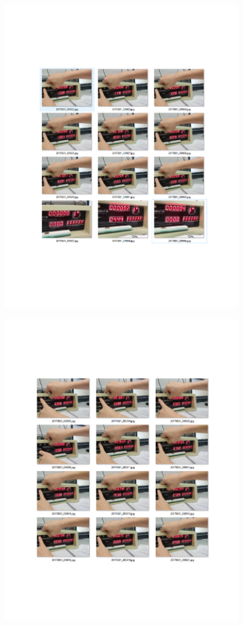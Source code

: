 \documentclass{article}
\begin{document}
					\begin{figure}[!htb]
					\begin{center}
					\includegraphics[width=0.9\textwidth]{b4}
					\end{center}\end{figure}
					\begin{figure}[!htb]
					\begin{center}
					\includegraphics[width=0.9\textwidth]{b3}
					\end{center}\end{figure}
\end{document}
